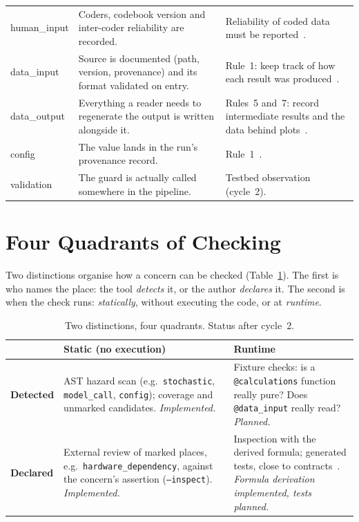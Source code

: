 \documentclass[conference,10pt]{IEEEtran}
\newcommand{\cc}[1]{\texttt{#1}}
\begin{document}
\begin{table}[t]
\begin{tabularx}{\textwidth}{@{}>{\ttfamily}l >{\raggedright\arraybackslash}X >{\raggedright\arraybackslash}X@{}}
human\_input & Coders, codebook version and inter-coder reliability are recorded. & Reliability of coded data must be reported~\cite{hayes2007}. \\
data\_input & Source is documented (path, version, provenance) and its format validated on entry. & Rule~1: keep track of how each result was produced~\cite{sandve2013}. \\
data\_output & Everything a reader needs to regenerate the output is written alongside it. & Rules~5 and~7: record intermediate results and the data behind plots~\cite{sandve2013}. \\
config & The value lands in the run's provenance record. & Rule~1~\cite{sandve2013}. \\
validation & The guard is actually called somewhere in the pipeline. & Testbed observation (cycle~2). \\
\bottomrule
\end{tabularx}
\end{table}

\section{Four Quadrants of Checking}
Two distinctions organise how a concern can be checked (Table~\ref{tab:quadrants}). The first is who names the place: the tool \emph{detects} it, or the author \emph{declares} it. The second is when the check runs: \emph{statically}, without executing the code, or at \emph{runtime}.

\begin{table}[t]
\caption{Two distinctions, four quadrants. Status after cycle~2.}
\label{tab:quadrants}
\centering
\footnotesize
\begin{tabularx}{\columnwidth}{@{}>{\bfseries}p{1.25cm} >{\raggedright\arraybackslash}X >{\raggedright\arraybackslash}X@{}}
\toprule
 & \textbf{Static (no execution)} & \textbf{Runtime} \\
\midrule
Detected & AST hazard scan (e.g.\ \cc{stochastic}, \cc{model\_call}, \cc{config}); coverage and unmarked candidates. \emph{Implemented.} & Fixture checks: is a \cc{@calculations} function really pure? Does \cc{@data\_input} really read? \emph{Planned.} \\
\addlinespace
Declared & External review of marked places, e.g.\ \cc{hardware\_dependency}, against the concern's assertion (\cc{--inspect}). \emph{Implemented.} & Inspection with the derived formula; generated tests, close to contracts~\cite{meyer1992}. \emph{Formula derivation implemented, tests planned.} \\
\bottomrule
\end{tabularx}
\end{table}
\end{document}
